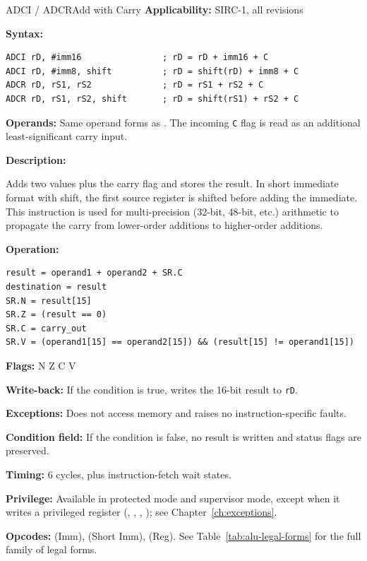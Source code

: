 \begin{instructionbox}{ADCI / ADCR}{Add with Carry}
	\textbf{Applicability:} SIRC-1, all revisions

	\textbf{Syntax:}
	\begin{lstlisting}
ADCI rD, #imm16                ; rD = rD + imm16 + C
ADCI rD, #imm8, shift          ; rD = shift(rD) + imm8 + C
ADCR rD, rS1, rS2              ; rD = rS1 + rS2 + C
ADCR rD, rS1, rS2, shift       ; rD = shift(rS1) + rS2 + C
\end{lstlisting}

	\textbf{Operands:} Same operand forms as . The incoming \texttt{C} flag is read as an additional
	least-significant carry input.

	\textbf{Description:}

	Adds two values plus the carry flag and stores the result. In short immediate format with shift, the first source
	register is shifted before adding the immediate. This instruction is used for multi-precision (32-bit, 48-bit, etc.)
	arithmetic to propagate the carry from lower-order additions to higher-order additions.

	\textbf{Operation:}
	\begin{verbatim}
result = operand1 + operand2 + SR.C
destination = result
SR.N = result[15]
SR.Z = (result == 0)
SR.C = carry_out
SR.V = (operand1[15] == operand2[15]) && (result[15] != operand1[15])
\end{verbatim}

	\textbf{Flags:} N Z C V

	\textbf{Write-back:} If the condition is true, writes the 16-bit result to \texttt{rD}.

	\textbf{Exceptions:} Does not access memory and raises no instruction-specific faults.

	\textbf{Condition field:} If the condition is false, no result is written and status flags are preserved.

	\textbf{Timing:} 6 cycles, plus instruction-fetch wait states.

	\textbf{Privilege:} Available in protected mode and supervisor mode, except when it writes a
	privileged register (, , , ); see Chapter~\ref{ch:exceptions}.

	\textbf{Opcodes:}  (Imm),  (Short Imm),  (Reg). See Table~\ref{tab:alu-legal-forms} for the full family of legal forms.


\end{instructionbox}
